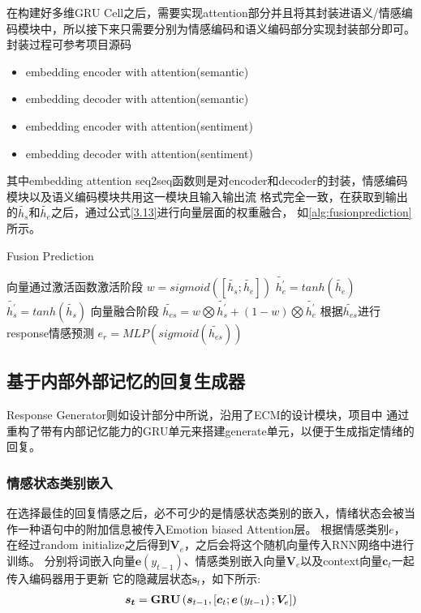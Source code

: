 \documentclass[supercite]{HustGraduPaper}
\theoremstyle{definition}
\begin{document}
在构建好多维GRU Cell之后，需要实现attention部分并且将其封装进语义/情感编码模块中，所以接下来只需要分别为情感编码和语义编码部分实现封装部分即可。封装过程可参考项目源码
\cite{ECMP}
\begin{itemize}
  \item embedding encoder with attention(semantic)
  \item embedding decoder with attention(semantic)
  \item embedding encoder with attention(sentiment)
  \item embedding decoder with attention(sentiment)
\end{itemize}

其中embedding attention seq2seq函数则是对encoder和decoder的封装，情感编码模块以及语义编码模块共用这一模块且输入输出流
格式完全一致，在获取到输出的$\widetilde{h_s}$和$\widetilde{h_e}$之后，通过公式\ref{3.13}进行向量层面的权重融合，
如\ref{alg:fusionprediction}所示。
\begin{algorithm}
  \caption{Fusion Prediction}
  \label{alg:fusionprediction}
  \begin{algorithmic}
      \State 向量通过激活函数激活阶段
      \State $w = sigmoid([\widetilde{h_s};\widetilde{h_e}])$
      \State ${\widetilde{h_e^{'}}} = tanh(\widetilde{h_e})$
      \State ${\widetilde{h_s^{'}}} = tanh(\widetilde{h_s})$
      \State 向量融合阶段
      \State ${\widetilde{h_{es}}} = w \bigotimes {\widetilde{h_s^{'}}} + (1 - w) \bigotimes {\widetilde{h_e^{'}}}$
      \State 根据$\widetilde{h_{es}}$进行response情感预测
      \State $e_r = MLP(sigmoid(\widetilde{h_{es}}))$
  \end{algorithmic}
\end{algorithm}

\subsection{基于内部外部记忆的回复生成器}
Response Generator则如设计部分中所说，沿用了ECM\cite{DBLP:journals/corr/ZhouHZZL17}的设计模块，项目中
通过重构了带有内部记忆能力的GRU单元来搭建generate单元，以便于生成指定情绪的回复。

\subsubsection{情感状态类别嵌入}
在选择最佳的回复情感之后，必不可少的是情感状态类别的嵌入，情绪状态会被当作一种语句中的附加信息被传入Emotion biased Attention层。
根据情感类别$e$，在经过random initialize之后得到$\boldsymbol{V}_e$，之后会将这个随机向量传入RNN网络中进行训练。
分别将词嵌入向量$\boldsymbol{e}(y_{t-1})$、情感类别嵌入向量$\boldsymbol{V}_e$以及context向量$\boldsymbol{c}_t$一起传入编码器用于更新
它的隐藏层状态$\boldsymbol{s}_t$，如下所示:
\begin{align}
  \boldsymbol { s } _ { \boldsymbol { t } } = \mathbf { G } \mathbf { R } \mathbf { U } \left( \boldsymbol { s } _ { t - 1 } , \left[ \boldsymbol { c } _ { t } ; \boldsymbol { e } \left( y _ { t - 1 } \right) ; \boldsymbol { V } _ { e } \right] \right) \notag
\end{align}
\end{document}
